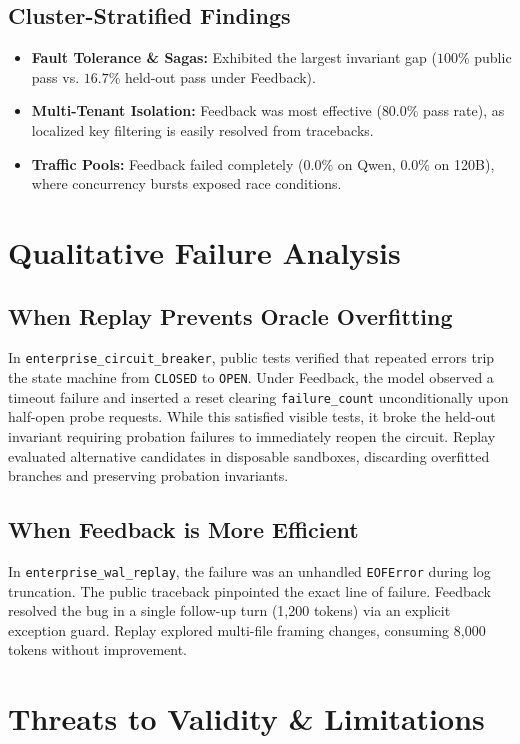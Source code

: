 \documentclass[10pt,twocolumn,letterpaper]{article}
\begin{document}
\subsection{Cluster-Stratified Findings}
\begin{itemize}
    \item \textbf{Fault Tolerance \& Sagas:} Exhibited the largest invariant gap ($100\%$ public pass vs. $16.7\%$ held-out pass under Feedback).
    \item \textbf{Multi-Tenant Isolation:} Feedback was most effective ($80.0\%$ pass rate), as localized key filtering is easily resolved from tracebacks.
    \item \textbf{Traffic Pools:} Feedback failed completely ($0.0\%$ on Qwen, $0.0\%$ on 120B), where concurrency bursts exposed race conditions.
\end{itemize}

\section{Qualitative Failure Analysis}

\subsection{When Replay Prevents Oracle Overfitting}
In \texttt{enterprise\_circuit\_breaker}, public tests verified that repeated errors trip the state machine from \texttt{CLOSED} to \texttt{OPEN}. Under Feedback, the model observed a timeout failure and inserted a reset clearing \texttt{failure\_count} unconditionally upon half-open probe requests. While this satisfied visible tests, it broke the held-out invariant requiring probation failures to immediately reopen the circuit. Replay evaluated alternative candidates in disposable sandboxes, discarding overfitted branches and preserving probation invariants.

\subsection{When Feedback is More Efficient}
In \texttt{enterprise\_wal\_replay}, the failure was an unhandled \texttt{EOFError} during log truncation. The public traceback pinpointed the exact line of failure. Feedback resolved the bug in a single follow-up turn (1,200 tokens) via an explicit exception guard. Replay explored multi-file framing changes, consuming 8,000 tokens without improvement.

\section{Threats to Validity \& Limitations}
\end{document}
